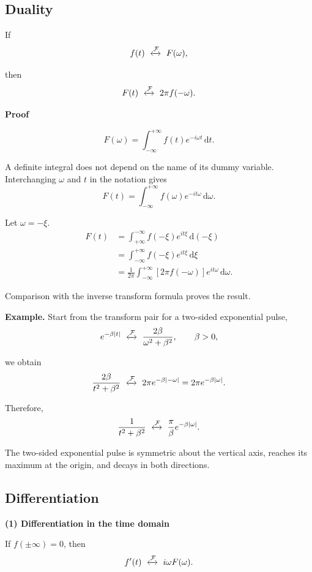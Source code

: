 \documentclass[11pt,a4paper]{article}
\theoremstyle{definition}
\theoremstyle{plain}
\begin{document}
\subsection{Duality}

If
\[
f(t)\ \xleftrightarrow{\mathcal F}\ F(\omega),
\]

then
\[
F(t)\ \xleftrightarrow{\mathcal F}\ 2\pi f(-\omega).
\]

\textbf{Proof}\par\nopagebreak[4]
\[
F(\omega)
=\int_{-\infty}^{+\infty}f(t)e^{-i\omega t}\,\mathrm dt.
\]

A definite integral does not depend on the name of its dummy variable.
Interchanging \(\omega\) and \(t\) in the notation gives
\[
F(t)=\int_{-\infty}^{+\infty}f(\omega)e^{-it\omega}\,\mathrm d\omega.
\]

Let \(\omega=-\xi\).
\[
\begin{aligned}
F(t)
&=\int_{+\infty}^{-\infty}
f(-\xi)e^{it\xi}\,\mathrm d(-\xi)\\
&=\int_{-\infty}^{+\infty}
f(-\xi)e^{it\xi}\,\mathrm d\xi\\
&=\frac1{2\pi}\int_{-\infty}^{+\infty}
[2\pi f(-\omega)]e^{it\omega}\,\mathrm d\omega.
\end{aligned}
\]

Comparison with the inverse transform formula proves the result.

\textbf{Example.} Start from the transform pair for a two-sided
exponential pulse,
\[
e^{-\beta|t|}
\ \xleftrightarrow{\mathcal F}\
\frac{2\beta}{\omega^2+\beta^2},
\qquad \beta>0,
\]

we obtain
\[
\frac{2\beta}{t^2+\beta^2}
\ \xleftrightarrow{\mathcal F}\
2\pi e^{-\beta|-\omega|}
=2\pi e^{-\beta|\omega|}.
\]

Therefore,
\[
\frac1{t^2+\beta^2}
\ \xleftrightarrow{\mathcal F}\
\frac{\pi}{\beta}e^{-\beta|\omega|}.
\]

The two-sided exponential
pulse is symmetric about the vertical axis, reaches its maximum at the
origin, and decays in both directions.

\subsection{Differentiation}

\textbf{(1) Differentiation in the time domain}

If \(f(\pm\infty)=0\), then
\[
f'(t)\ \xleftrightarrow{\mathcal F}\
i\omega F(\omega).
\]
\end{document}
